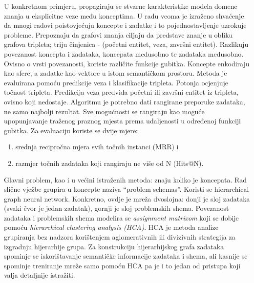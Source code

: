 U konkretnom primjeru, propagiraju se stvarne karakteristike modela domene znanja u eksplicitne veze među konceptima.\newline
\newline
U radu \citep{trans} veoma je izraženo shvaćenje da mnogi radovi poistovjećuju koncepte i zadatke i to pojednostavljenje uzrokuje probleme.\newline
Prepoznaju da grafovi znanja ciljaju da predstave znanje u obliku grafova tripleta; triju činjenica - (početni entitet, veza, završni entitet).\newline
Razlikuju povezanost koncepta i zadataka, koncepata međusobno te zadataka međusobno. Ovisno o vrsti povezanosti, koriste različite funkcije gubitka.\newline
Koncepte enkodiraju kao sfere, a zadatke kao vektore u istom semantičkom prostoru.\newline
Metoda je evaluirana pomoću predikcije veza i klasifikacije tripleta. Potonja ocjenjuje točnost tripleta.
Predikcija veza predviđa početni ili završni entitet iz tripleta, ovisno koji nedostaje. Algoritmu je potrebno dati rangirane preporuke zadataka, ne samo najbolji rezultat.
Sve mogućnosti se rangiraju kao moguće upopunjavanje traženog praznog mjesta prema udaljenosti u određenoj funkciji gubitka. Za evaluaciju koriste se dvije mjere:
\begin{enumerate}
\item srednja recipročna mjera svih točnih instanci (MRR) i
\item razmjer točnih zadataka koji rangiraju ne više od N (Hits@N).
\end{enumerate}
Glavni problem, kao i u većini istraženih metoda: znaju koliko je koncepata.\newline
\newline
Rad \citep{hgkt} slične vježbe grupira u koncepte naziva “problem schemas”. Koristi se hierarchical graph neural network. Konkretno, ovdje je mreža dvoslojna: donji je sloj zadataka (svaki čvor je jedan zadatak), gornji je sloj problemskih shema. Povezanost zadataka i problemskih shema modelira se \textit{assignment matrixom} koji se dobije pomoću \textit{hierarchical clustering analysis (HCA)}. HCA je metoda analize grupiranja bez nadzora korištenjem aglomerativnih ili divizivnih strategija za izgradnju hijerarhije grupa.
Za konstrukciju hijerarhijskog grafa zadataka spominje se iskorištavanje semantičke informacije zadataka i shema, ali kasnije se  spominje treniranje mreže samo pomoću HCA pa je i to jedan od pristupa koji valja detaljnije istražiti.\newline
